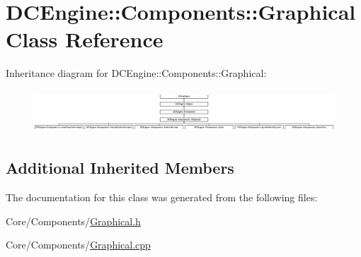 \hypertarget{classDCEngine_1_1Components_1_1Graphical}{\section{D\-C\-Engine\-:\-:Components\-:\-:Graphical Class Reference}
\label{classDCEngine_1_1Components_1_1Graphical}
}
Inheritance diagram for D\-C\-Engine\-:\-:Components\-:\-:Graphical\-:\begin{figure}[H]
\begin{center}
\leavevmode
\includegraphics[height=1.626016cm]{classDCEngine_1_1Components_1_1Graphical}
\end{center}
\end{figure}
\subsection*{Additional Inherited Members}


The documentation for this class was generated from the following files\-:\begin{DoxyCompactItemize}
\item 
Core/\-Components/\hyperlink{Graphical_8h}{Graphical.\-h}\item 
Core/\-Components/\hyperlink{Graphical_8cpp}{Graphical.\-cpp}\end{DoxyCompactItemize}
